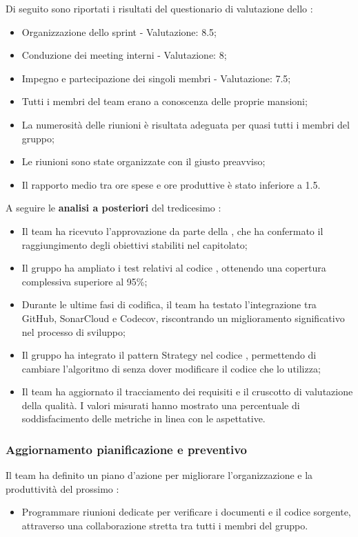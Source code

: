 \par Di seguito sono riportati i risultati del questionario di valutazione dello :
\begin{itemize}
  \item Organizzazione dello sprint - Valutazione: 8.5;
  \item Conduzione dei meeting interni - Valutazione: 8;
  \item Impegno e partecipazione dei singoli membri - Valutazione: 7.5;
  \item Tutti i membri del team erano a conoscenza delle proprie mansioni;
  \item La numerosità delle riunioni è risultata adeguata per quasi tutti i membri del gruppo;
  \item Le riunioni sono state organizzate con il giusto preavviso;
  \item Il rapporto medio tra ore spese e ore produttive è stato inferiore a 1.5.
\end{itemize}

\vspace{0.5\baselineskip}
\par A seguire le \textbf{analisi a posteriori} del tredicesimo :
\begin{itemize}
  \item Il team ha ricevuto l'approvazione da parte della , che ha confermato il raggiungimento degli obiettivi stabiliti nel capitolato;
  \item Il gruppo ha ampliato i test relativi al codice , ottenendo una copertura complessiva superiore al 95\%;
  \item Durante le ultime fasi di codifica, il team ha testato l'integrazione tra GitHub, SonarCloud e Codecov, riscontrando un miglioramento significativo nel processo di sviluppo;
  \item Il gruppo ha integrato il pattern Strategy nel codice , permettendo di cambiare l'algoritmo di  senza dover modificare il codice che lo utilizza;
  \item Il team ha aggiornato il tracciamento dei requisiti e il cruscotto di valutazione della qualità. I valori misurati hanno mostrato una percentuale di soddisfacimento delle metriche in linea con le aspettative.
\end{itemize}

\subsubsection{Aggiornamento pianificazione e preventivo}
\par Il team ha definito un piano d'azione per migliorare l'organizzazione e la produttività del prossimo :
\begin{itemize}
  \item Programmare riunioni dedicate per verificare i documenti e il codice sorgente, attraverso una collaborazione stretta tra tutti i membri del gruppo.
\end{itemize}


